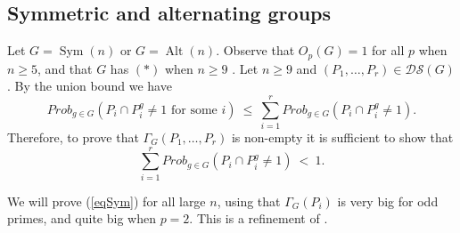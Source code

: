 \documentclass[11pt]{amsart}
\numberwithin{equation}{section}
\theoremstyle{definition}
\theoremstyle{remark}
\newcommand{\Sym}{\mathop{\mathrm{Sym}}}
\newcommand{\Alt}{\mathop{\mathrm{Alt}}}
\newcommand{\DS}{\mathcal{DS}}
\begin{document}
\subsection{Symmetric and alternating groups} 

Let $G=\Sym(n)$ or $G=\Alt(n)$.
Observe that $O_p(G) =1$ for all $p$ when $n \geq 5$,
and that $G$ has $(*)$ when $n \geq 9$ \cite{MZ96}.
Let $n \geq 9$ and $(P_1,\ldots,P_r) \in \DS(G)$.
By the union bound we have
$$ Prob_{g \in G} ( P_i \cap P_i^g \neq 1 \mbox{ for some } i  ) 
\> \leq \>
\sum_{i=1}^r Prob_{g \in G} (P_i \cap P_i^g \neq 1) . $$
Therefore, to prove that $\Gamma_G(P_1,\ldots,P_r)$ is non-empty it is sufficient to show that
\begin{equation} \label{eqSym}
\sum_{i=1}^r Prob_{g \in G}(P_i \cap P_i^g \neq 1) \> < \> 1 .
\end{equation}

We will prove (\ref{eqSym}) for all large $n$,
using that $\Gamma_G(P_i)$ is very big for odd primes, and quite big when $p=2$.
This is a refinement of \cite[Th. 1.1]{DGG+25}.
\end{document}
